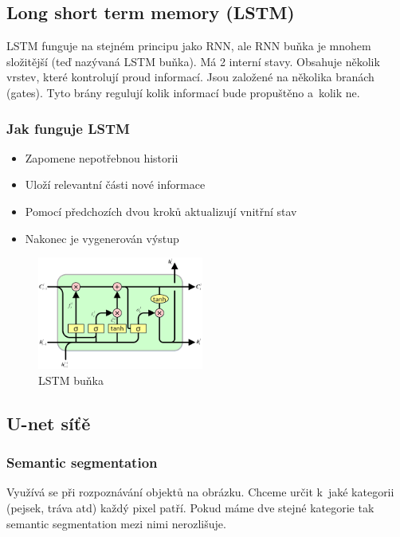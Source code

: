 \subsection{Long short term memory (LSTM)}

LSTM funguje na stejném principu jako RNN, ale RNN buňka je mnohem složitější (teď nazývaná LSTM buňka).
Má 2 interní stavy.
Obsahuje několik vrstev, které kontrolují proud informací.
Jsou založené na několika branách (gates).
Tyto brány regulují kolik informací bude propuštěno a~kolik ne.

\subsubsection{Jak funguje LSTM}

\begin{itemize}
	\item Zapomene nepotřebnou historii
	\item Uloží relevantní části nové informace
	\item Pomocí předchozích dvou kroků aktualizují vnitřní stav
	\item Nakonec je vygenerován výstup
\end{itemize}

\begin{figure}[h]
    \centering
	\includegraphics[height=10em]{images/09_lstm.png}
    \caption{LSTM buňka}
    \label{LSTM}
\end{figure}

\subsection{U-net síťě}

\subsubsection{Semantic segmentation}

Využívá se při rozpoznávání objektů na obrázku.
Chceme určit k~jaké kategorii (pejsek, tráva atd) každý pixel patří.
Pokud máme dve stejné kategorie tak semantic segmentation mezi nimi nerozlišuje.

